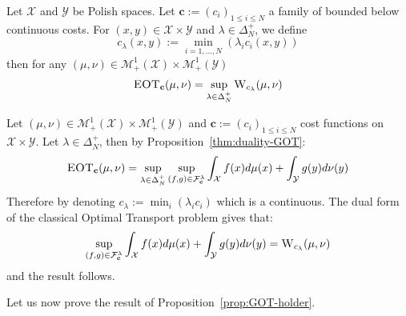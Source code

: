 \begin{lemma}
\label{lem:sup_wasser}
Let $\mathcal{X}$ and $\mathcal{Y}$ be Polish spaces. Let $\mathbf{c}:=(c_i)_{1\leq i\leq N}$ a family of bounded below continuous costs. For $(x,y)\in \mathcal{X}\times \mathcal{Y}$ and $\lambda\in\Delta_N^{+}$, we define 
$$c_\lambda(x,y):=\min_{i=1,...,N}(\lambda_i c_i(x,y))$$
then for any $(\mu,\nu)\in\mathcal{M}_+^{1}(\mathcal{X})\times\mathcal{M}_+^{1}(\mathcal{Y})$  
\begin{align}
    \textsc{EOT}_{\mathbf{c}}(\mu,\nu)=\sup_{\lambda\in\Delta_N^{+}} \textsc{W}_{c_\lambda}(\mu,\nu)
\end{align}
\end{lemma}

\begin{prv*}
Let $(\mu,\nu)\in\mathcal{M}_+^{1}(\mathcal{X})\times\mathcal{M}_+^{1}(\mathcal{Y})$ and $\mathbf{c}:=(c_i)_{1\leq i\leq N}$ cost functions on $\mathcal{X}\times \mathcal{Y}$. Let $\lambda\in\Delta_N^{+}$, then by Proposition~\ref{thm:duality-GOT}:
\begin{align*}
    \textsc{EOT}_{\mathbf{c}}(\mu,\nu)= \sup_{\lambda\in\Delta_N^{+}} \sup_{(f,g)\in \mathcal{F}_{\mathbf{c}}^{\lambda}} \int_{\mathcal{X}} f(x)d\mu(x)+ \int_{\mathcal{Y}} g(y)d\nu(y)
\end{align*}
Therefore by denoting $c_\lambda:=\min_i(\lambda_ic_i)$ which is a continuous. The dual form of the classical Optimal Transport problem gives that:
\begin{align*}
\sup_{(f,g)\in \mathcal{F}_{\mathbf{c}}^{\lambda}} \int_{\mathcal{X}} f(x)d\mu(x)+ \int_{\mathcal{Y}} g(y)d\nu(y) =  \textsc{W}_{c_\lambda}(\mu,\nu)
\end{align*}
and the result follows.
\end{prv*}


Let us now prove the result of Proposition~\ref{prop:GOT-holder}. 


